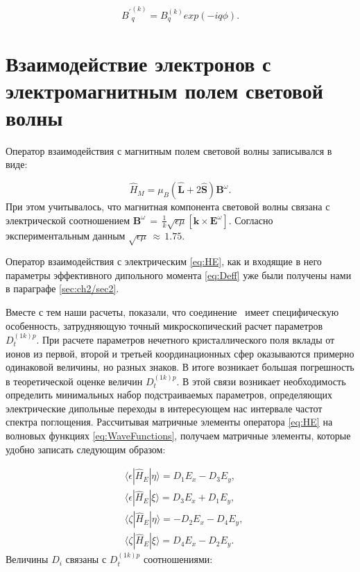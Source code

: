 \begin{equation}
	\label{eq:BkqLocal}
	{B^\prime}_q^{(k)} = B_q^{(k)} exp(-iq\phi).
\end{equation}


\section{Взаимодействие электронов с электромагнитным полем световой волны}\label{sec:ch3/sect2}

Оператор взаимодействия с магнитным полем световой волны записывался в виде:

\begin{equation}
	\label{eq:HM}
	\hat{H}_M = \mu_B (\hat{\bm{L}} + 2\hat{\bm{S}}) \bm{B}^{\omega}.
\end{equation}
При этом учитывалось, что магнитная компонента световой волны связана с электрической соотношением $\bm{B}^\omega \, {=} \, \frac{1}{k} \sqrt{\epsilon\mu} [\bm{k} \times \bm{E}^\omega]$. Согласно экспериментальным данным \cite{Pisarev2011} $\sqrt{\epsilon\mu} \, {\approx} \, 1.75$.

Оператор взаимодействия с электрическим \cref{eq:HE}, как и входящие в него параметры эффективного дипольного момента \cref{eq:Deff} уже были получены нами в параграфе \cref{sec:ch2/sec2}. 

Вместе с тем наши расчеты, показали, что соединение \cbo\ имеет специфическую особенность, затрудняющую точный микроскопический расчет параметров $D_t^{(1k)p}$. При расчете параметров нечетного кристаллического поля вклады от ионов из первой, второй и третьей координационных сфер оказываются примерно одинаковой величины, но разных знаков. В итоге возникает большая погрешность в теоретической оценке величин $D_t^{(1k)p}$. В этой связи возникает необходимость определить минимальных набор подстраиваемых параметров, определяющих электрические дипольные переходы в интересующем нас интервале частот спектра поглощения. Рассчитывая матричные элементы оператора \cref{eq:HE} на волновых функциях \cref{eq:WaveFunctions}, получаем матричные элементы, которые удобно записать следующим образом:

\begin{equation}
	\label{eq:HeMatrixElements}
	\begin{aligned}
		& \langle \epsilon | \hat{H}_E | \eta \rangle = D_1 E_x - D_3 E_y, \\
		& \langle \epsilon | \hat{H}_E | \xi \rangle = D_3 E_x + D_1 E_y, \\
		& \langle \zeta | \hat{H}_E | \eta \rangle = - D_2 E_x - D_4 E_y, \\
		& \langle \zeta | \hat{H}_E | \xi \rangle = D_4 E_x - D_2 E_y.
	\end{aligned}
\end{equation}
Величины $D_i$ связаны с $D_t^{(1k)p}$ соотношениями:


